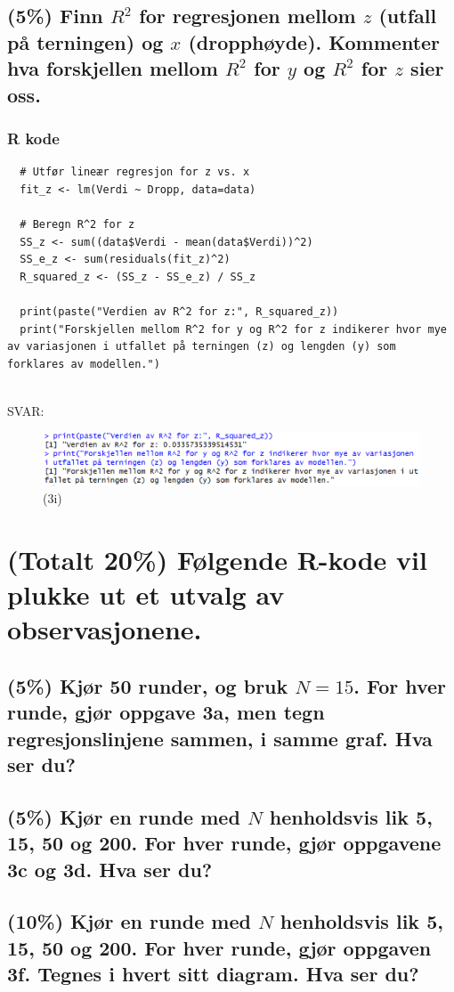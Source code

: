\documentclass[12pt]{article}
\begin{document}
\subsection{(5\%) Finn $R^2$ for regresjonen mellom $z$ (utfall på terningen) og $x$ (dropphøyde). Kommenter hva forskjellen mellom $R^2$ for $y$ og $R^2$ for $z$ sier oss.}
\subsubsection{R kode}
\begin{verbatim}
  # Utfør lineær regresjon for z vs. x
  fit_z <- lm(Verdi ~ Dropp, data=data)
  
  # Beregn R^2 for z
  SS_z <- sum((data$Verdi - mean(data$Verdi))^2)
  SS_e_z <- sum(residuals(fit_z)^2)
  R_squared_z <- (SS_z - SS_e_z) / SS_z
  
  print(paste("Verdien av R^2 for z:", R_squared_z))
  print("Forskjellen mellom R^2 for y og R^2 for z indikerer hvor mye av variasjonen i utfallet på terningen (z) og lengden (y) som forklares av modellen.")
  
\end{verbatim}
SVAR:
\begin{figure}[H]
  \centering
  \includegraphics[width=1\textwidth]{3i.png}
  \caption{(3i)}
\end{figure}


\section{(Totalt 20\%) Følgende R-kode vil plukke ut et utvalg av observasjonene.}
\subsection{(5\%) Kjør 50 runder, og bruk $N = 15$. For hver runde, gjør oppgave 3a, men tegn regresjonslinjene sammen, i samme graf. Hva ser du?}
\subsection{(5\%) Kjør en runde med $N$ henholdsvis lik 5, 15, 50 og 200. For hver runde, gjør oppgavene 3c og 3d. Hva ser du?}
\subsection{(10\%) Kjør en runde med $N$ henholdsvis lik 5, 15, 50 og 200. For hver runde, gjør oppgaven 3f. Tegnes i hvert sitt diagram. Hva ser du?}
\end{document}
